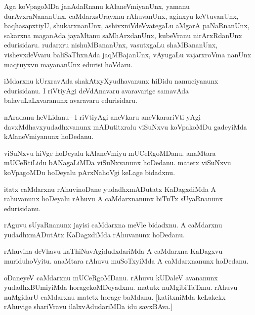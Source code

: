 \documentclass{article}
\begin{document}
\begin{mn}%
Aga koVpagoMDa janAdaRnanu kAlaneVmiyanUnx, yamanu durAvxraNananUnx, caMdarxsUrayxnu 
rAhuvanUnx, aginxyu keVtuvanUnx, baqhasapxtiyU, shukarxnanUnx, ashivxniVdeVvategaLu aMgarA 
paNaRnanUnx, sakarxna maganAda jayaMtanu saMhArxdanUnx, kubeVranu nirArxRdanUnx 
edurisidaru. rudarxru nishuMBananUnx, vasutxgaLu shaMBananUnx, vishevxdeVvaru baliSaThxnAda 
jaqMBajanUnx, vAyugaLu vajarxroVma nanUnx maqtuyxvu mayananUnx edurisi hoVdaru.
\end{mn}

\begin{mn}%
iMdarxnu kUrxravAda shakAtxyXyudhavanunx hiDidu namuciyanunx edurisidanu. I riVtiyAgi 
deVdAnavaru avaravarige samavAda balavuLaLxvaranunx avaravaru edurisidaru.
\end{mn}


\begin{mn}%
nAradanu heVLidanu-- I riVtiyAgi aneVkaru aneVkarariVti yAgi davxMdhavxyudadhxvanunx 
mADutitxralu viSuNxvu koVpakoMDu gadeyiMda kAlaneVmiyanunx hoDedanu.
\end{mn}

\begin{mn}%
viSuNxvu hiVge hoDeyalu kAlaneVmiyu mUCeRgoMDanu. anaMtara mUCeRtiLidu bANagaLiMDa 
viSuNxvanunx hoDedanu. matetx viSuNxvu koVpagoMDu hoDeyalu pArxNahoVgi keLage bidadxnu.
\end{mn}

\begin{mn}%
itatx caMdarxnu rAhuvinoDane yudadhxmADutatx KaDagxdiMda A rahuvanunx hoDeyalu rAhuvu A 
caMdarxnanunx biTuTx sUyaRnanunx edurisidanu. 
\end{mn}

\begin{mn}%
rAguvu sUyaRnanunx jayisi caMdarxna meVle bidadxnu. A caMdarxnu yudadhxmADutAtx KaDagxdiMda 
rAhuvanunx hoDedanu.
\end{mn}

\begin{mn}%
rAhuvina deVhavu kaThiNavAgidudxdariMda A caMdarxna KaDagxvu muriduhoVyitu. anaMtara rAhuvu 
muSoTxyiMda A caMdarxnanunx hoDedanu.
\end{mn}

\begin{mn}%
oDaneyeV caMdarxnu mUCeRgoMDanu. rAhuvu kUDaleV avananunx yudadhxBUmiyiMda 
horagekoMDoyadxnu. matutx nuMgibiTaTxnu. rAhuvu nuMgidarU caMdarxnu matetx horage baMdanu. 
[katitxniMda keLakekx rAhuvige shariVravu ilalxvAdudariMDa idu savxBAva.]
\end{mn}
\end{document}
